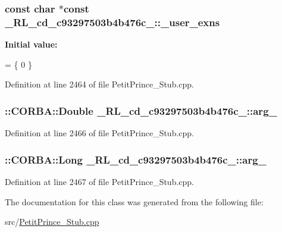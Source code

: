 \subsubsection[{\texorpdfstring{\+\_\+user\+\_\+exns}{_user_exns}}]{\setlength{\rightskip}{0pt plus 5cm}const char $\ast$const \+\_\+R\+L\+\_\+cd\+\_\+c93297503b4b476c\+\_\+::\+\_\+user\+\_\+exns\hspace{0.3cm}{\ttfamily [static]}}\hypertarget{class__0_r_l__cd__c93297503b4b476c__91000000_aa63022c9794a1db3032cf14c0946369e}{}\label{class__0_r_l__cd__c93297503b4b476c__91000000_aa63022c9794a1db3032cf14c0946369e}
{\bfseries Initial value\+:}
\begin{DoxyCode}
= \{
  0
\}
\end{DoxyCode}


Definition at line 2464 of file Petit\+Prince\+\_\+\+Stub.\+cpp.

\subsubsection[{\texorpdfstring{arg\+\_\+0}{arg_0}}]{\setlength{\rightskip}{0pt plus 5cm}\+::C\+O\+R\+B\+A\+::\+Double \+\_\+R\+L\+\_\+cd\+\_\+c93297503b4b476c\+\_\+::arg\+\_}\hypertarget{class__0_r_l__cd__c93297503b4b476c__91000000_a87b6d297a7f1a56579d8d3fb6c3070f9}{}\label{class__0_r_l__cd__c93297503b4b476c__91000000_a87b6d297a7f1a56579d8d3fb6c3070f9}


Definition at line 2466 of file Petit\+Prince\+\_\+\+Stub.\+cpp.

\subsubsection[{\texorpdfstring{arg\+\_\+1}{arg_1}}]{\setlength{\rightskip}{0pt plus 5cm}\+::C\+O\+R\+B\+A\+::\+Long \+\_\+R\+L\+\_\+cd\+\_\+c93297503b4b476c\+\_\+::arg\+\_}\hypertarget{class__0_r_l__cd__c93297503b4b476c__91000000_a48914b58e05510223789862d5cbd7ec3}{}\label{class__0_r_l__cd__c93297503b4b476c__91000000_a48914b58e05510223789862d5cbd7ec3}


Definition at line 2467 of file Petit\+Prince\+\_\+\+Stub.\+cpp.



The documentation for this class was generated from the following file\+:\begin{DoxyCompactItemize}
\item 
src/\hyperlink{_petit_prince___stub_8cpp}{Petit\+Prince\+\_\+\+Stub.\+cpp}\end{DoxyCompactItemize}
